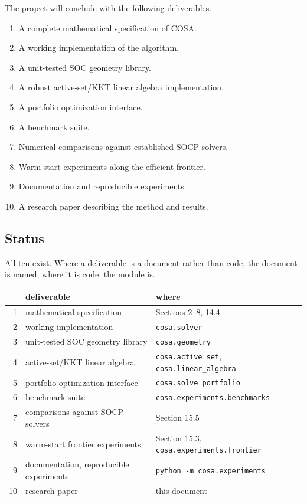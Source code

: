 \documentclass[11pt,a4paper]{article}
\begin{document}
The project will conclude with the following deliverables.

\begin{enumerate}
    \item A complete mathematical specification of COSA.
    \item A working implementation of the algorithm.
    \item A unit-tested SOC geometry library.
    \item A robust active-set/KKT linear algebra implementation.
    \item A portfolio optimization interface.
    \item A benchmark suite.
    \item Numerical comparisons against established SOCP solvers.
    \item Warm-start experiments along the efficient frontier.
    \item Documentation and reproducible experiments.
    \item A research paper describing the method and results.
\end{enumerate}

\subsection{Status}

All ten exist. Where a deliverable is a document rather than code, the
document is named; where it is code, the module is.

\begin{center}
\begin{tabular}{rll}
\hline
& deliverable & where\\
\hline
1 & mathematical specification & Sections 2--8, 14.4\\
2 & working implementation & \verb|cosa.solver|\\
3 & unit-tested SOC geometry library & \verb|cosa.geometry|\\
4 & active-set/KKT linear algebra & \verb|cosa.active_set|,
\verb|cosa.linear_algebra|\\
5 & portfolio optimization interface & \verb|cosa.solve_portfolio|\\
6 & benchmark suite & \verb|cosa.experiments.benchmarks|\\
7 & comparisons against SOCP solvers & Section 15.5\\
8 & warm-start frontier experiments & Section 15.3,
\verb|cosa.experiments.frontier|\\
9 & documentation, reproducible experiments &
\verb|python -m cosa.experiments|\\
10 & research paper & this document\\
\hline
\end{tabular}
\end{center}
\end{document}
